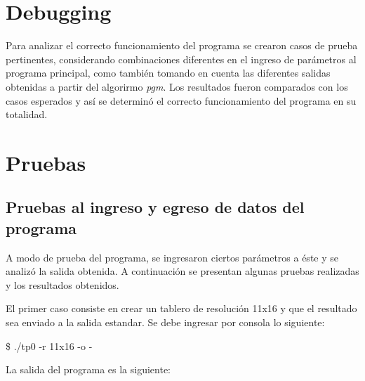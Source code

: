 \documentclass{article}
\begin{document}
\section{Debugging}
	
	Para analizar el correcto funcionamiento del programa se crearon casos de prueba pertinentes, considerando combinaciones diferentes en el ingreso de parámetros al programa principal, como también tomando en cuenta las diferentes salidas obtenidas a partir del algorirmo \textit{pgm}. Los resultados fueron comparados con los casos esperados y así se determinó el correcto funcionamiento del programa en su totalidad.
\bigskip\bigskip




\section{Pruebas}

\subsection{Pruebas al ingreso y egreso de datos del programa}
\medskip

	A modo de prueba del programa, se ingresaron ciertos parámetros a éste y se analizó la salida obtenida. A continuación se presentan algunas pruebas realizadas y los resultados obtenidos.
	\par
	El primer caso consiste en crear un tablero de resolución 11x16 y que el resultado sea enviado a la salida estandar. Se debe ingresar por consola lo siguiente:
	\bigskip

{\ttfamily\footnotesize
\indent \$ ./tp0 -r 11x16 -o -\\}
\smallskip

	La salida del programa es la siguiente:
	\bigskip
\end{document}
